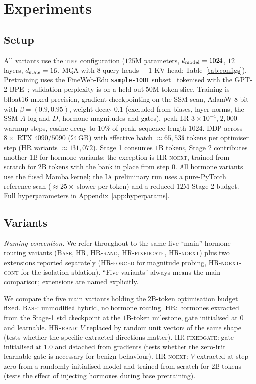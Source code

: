 \section{Experiments}
\label{sec:experiments}

\subsection{Setup}

All variants use the \textsc{tiny} configuration ($125$M parameters, $d_{\text{model}} = 1024$, $12$ layers, $d_{\text{state}} = 16$, MQA with 8 query heads + 1 KV head; Table~\ref{tab:configs}). Pretraining uses the FineWeb-Edu \texttt{sample-10BT} subset~\citep{lozhkov2024fineweb} tokenised with the GPT-2 BPE~\citep{radford2019language}; validation perplexity is on a held-out $50$M-token slice. Training is bfloat16 mixed precision, gradient checkpointing on the SSM scan, AdamW 8-bit~\citep{loshchilov2017decoupled,dettmers20218bit} with $\beta = (0.9, 0.95)$, weight decay $0.1$ (excluded from biases, layer norms, the SSM $A$-log and $D$, hormone magnitudes and gates), peak LR $3 \times 10^{-4}$, $2{,}000$ warmup steps, cosine decay to $10\%$ of peak, sequence length $1024$. DDP across $8\times$ RTX $4090$/$5090$ ($24$\,GB) with effective batch $\approx 65{,}536$ tokens per optimiser step (HR variants $\approx 131{,}072$). Stage 1 consumes $1$B tokens, Stage 2 contributes another $1$B for hormone variants; the exception is \textsc{HR-noext}, trained from scratch for $2$B tokens with the bank in place from step $0$. All hormone variants use the fused Mamba kernel; the IA preliminary run uses a pure-PyTorch reference scan ($\approx 25\times$ slower per token) and a reduced $12$M Stage-2 budget. Full hyperparameters in Appendix~\ref{app:hyperparams}.

\subsection{Variants}
\label{subsec:variants}

\emph{Naming convention.} We refer throughout to the same five ``main'' hormone-routing variants (\textsc{Base}, \textsc{HR}, \textsc{HR-rand}, \textsc{HR-fixedgate}, \textsc{HR-noext}) plus two extensions reported separately (\textsc{HR-forced} for magnitude probing, \textsc{HR-noext-cont} for the isolation ablation). ``Five variants'' always means the main comparison; extensions are named explicitly.

We compare the five main variants holding the $2$B-token optimisation budget fixed. \textsc{Base}: unmodified hybrid, no hormone routing. \textsc{HR}: hormones extracted from the Stage-1 std checkpoint at the $1$B-token milestone, gate initialised at $0$ and learnable. \textsc{HR-rand}: $V$ replaced by random unit vectors of the same shape (tests whether the specific extracted directions matter). \textsc{HR-fixedgate}: gate initialised at $1.0$ and detached from gradients (tests whether the zero-init learnable gate is necessary for benign behaviour). \textsc{HR-noext}: $V$ extracted at step zero from a randomly-initialised model and trained from scratch for $2$B tokens (tests the effect of injecting hormones during base pretraining).

